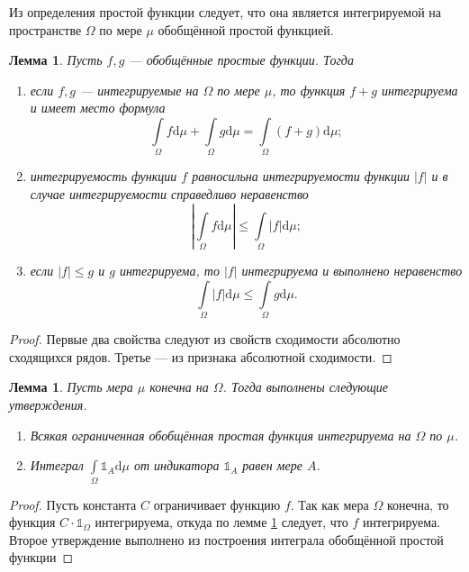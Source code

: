 \documentclass[12pt]{article}
\newtheorem{lemma}[theorem]{Лемма}
\numberwithin{theorem}{section}
\theoremstyle{definition}
\newcommand{\ind}{\mathds{1}}
\newcommand{\diff}{\mathrm{d}}
\begin{document}
	Из определения простой функции следует, что она является интегрируемой на пространстве $ \Omega $ по мере $ \mu $
	обобщённой простой функцией.
	
	\begin{lemma} \label{integrability of generalized simple functions}
		Пусть $ f, g $ ---  обобщённые простые функции.
		Тогда
		\begin{enumerate}
			\item если $ f, g $ --- интегрируемые на $ \Omega $ по мере $ \mu $, 
			то функция $ f + g $ интегрируема и имеет место формула
			$$ \int\limits_{\Omega} f\diff\mu + \int\limits_{\Omega} g\diff\mu = \int\limits_{\Omega} (f + g)\diff\mu; $$
			\item интегрируемость функции $ f $ равносильна интегрируемости функции $ |f| $ 
			и в случае интегрируемости справедливо неравенство
			$$ \left|\int\limits_{\Omega} f\diff\mu\right| \leqslant \int\limits_{\Omega} |f|\diff\mu; $$
			\item если $ |f| \leqslant g $ и $ g $ интегрируема, то $ |f| $ интегрируема и выполнено неравенство
			$$ \int\limits_{\Omega} |f|\diff\mu \leqslant \int\limits_{\Omega} g\diff\mu. $$
		\end{enumerate}
	\end{lemma}
	
	\begin{proof}
		Первые два свойства следуют из свойств сходимости абсолютно сходящихся рядов.
		Третье --- из признака абсолютной сходимости.
	\end{proof}
	
	\begin{lemma} \label{finite measure and generalized simple functions}
		Пусть мера $ \mu $ конечна на $ \Omega $. Тогда выполнены следующие утверждения.
		\begin{enumerate}
			\item Всякая ограниченная обобщённая простая функция интегрируема на $ \Omega $ по $ \mu $.
			\item Интеграл $ \int\limits_{\Omega} \ind_{A}\diff\mu $ от индикатора $ \ind_{A} $ равен мере $ A $.
		\end{enumerate}
	\end{lemma}
	
	\begin{proof}
		Пусть константа $ C $ ограничивает функцию $ f $. Так как мера $ \Omega $ конечна, 
		то функция $ C\cdot \ind_{\Omega} $ интегрируема, откуда по лемме \ref{integrability of generalized simple functions} следует, что $ f $ интегрируема.
		Второе утверждение выполнено из построения интеграла обобщённой простой функции
	\end{proof}
	
\end{document}
